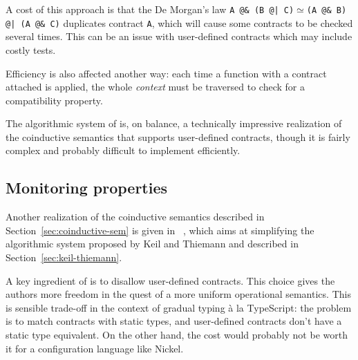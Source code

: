 \documentclass[sigplan,10pt]{acmart}
\newcommand{\nickel}[1]{\lstinline[language=nickel]{#1}}
\begin{document}
A cost of this approach is that the De Morgan's law
\nickel{A @& (B @| C)}$\simeq$\nickel{(A @& B) @| (A @& C)} duplicates
contract \nickel{A}, which will cause some contracts to be checked
several times. This can be an issue with user-defined contracts which
may include costly tests.

Efficiency is also affected another way: each time a function with a
contract attached is applied, the whole \emph{context} must be
traversed to check for a compatibility property.

The algorithmic system of \citeauthor{KeilThiemannUnionIntersection}
is, on balance, a technically impressive realization of the coinductive
semantics that supports user-defined contracts, though it is fairly complex and
probably difficult to implement efficiently.

\subsection{Monitoring properties}
\label{sec:will-morr-wadl}

Another realization of the coinductive semantics described in
Section~\ref{sec:coinductive-sem} is given in
\citeauthor{RootCauseOfBlame}~\cite{RootCauseOfBlame}, which aims at simplifying
the algorithmic system proposed by Keil and Thiemann and described in
Section~\ref{sec:keil-thiemann}.

A key ingredient of \citeauthor{RootCauseOfBlame} is to disallow user-defined contracts. This
choice gives the authors more freedom in the quest of a more uniform operational
semantics. This is sensible trade-off in the context of gradual typing à la
TypeScript: the problem is to match contracts with static types, and
user-defined contracts don't have a static type equivalent. On the other hand,
the cost would probably not be worth it for a configuration language like
Nickel.

%

\end{document}
